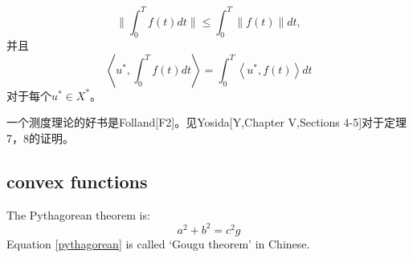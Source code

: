 \documentclass[leqno]{article}%
\begin{document}
\begin{equation*}
\|\int_{0}^{T}f(t)dt\|\leq \int_{0}^{T}\|f(t)\|dt,
\end{equation*}
并且
\begin{equation*}
\left<u^{*},\int_{0}^{T}f(t)dt\right>=\int_{0}^{T}\left<u^{*},f(t)\right>dt
\end{equation*}
对于每个$u^{*}\in X^{*}$。\par
一个测度理论的好书是Folland[F2]。见Yosida[Y,Chapter V,Sections 4-5]对于定理7，8的证明。
















\subsection{convex functions}


The Pythagorean theorem is:
\begin{equation}
a^2 + b^2 = c^2 \label{pythagorean}
g
\end{equation}
Equation \eqref{pythagorean} is
called `Gougu theorem' in Chinese.
\end{document}
